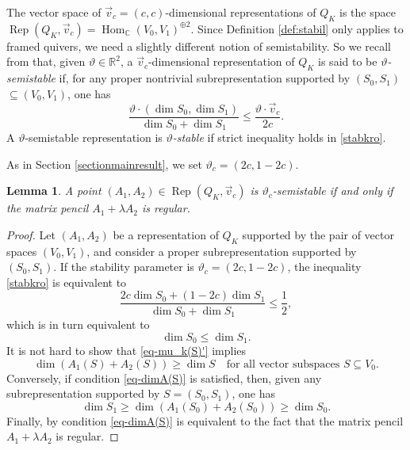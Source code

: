 \documentclass[pdftex]{sigma}
\numberwithin{equation}{section}
\newtheorem{Lemma}[Theorem]{Lemma}
\begin{document}
The vector space of $\vec{v}_c=(c,c)$-dimensional representations of $Q_{K}$ is the space
$\operatorname{Rep}(Q_K, \vec{v}_c) = \operatorname{Hom}_{\mathbb{C}}( V_0, V_1)^{\oplus 2}$.
Since Definition \ref{def:stabil} only applies to framed quivers, we need a slightly different notion of semistability.
So we recall from \cite{KiQ, Rud97} that, given $\vartheta\in\mathbb R^2$, a $\vec{v}_c$-dimensional representation of $Q_K$ is said to be \emph{$\vartheta$-semistable} if, for any proper nontrivial subrepresentation supported by $(S_0,S_1)$ {$\subseteq (V_0,V_1)$}, one has
\begin{equation}\label{stabkro}
\frac{\vartheta\cdot(\dim S_0,\dim S_1)}{\dim S_0 +\dim S_1} \leq
\frac{\vartheta\cdot \vec{v}_c}{2 c } .
\end{equation}
A $\vartheta$-semistable representation is \emph{$\vartheta$-stable} if strict inequality holds in \eqref{stabkro}.

As in Section \ref{sectionmainresult}, we set $\vartheta_c = (2c, 1-2c)$.
\begin{Lemma}
\label{lm-Q_K-ss}
A point $(A_{1},A_{2})\in \operatorname{Rep}(Q_K, \vec{v}_c)$ is $\vartheta_{c}$-semistable if and only if
the matrix pencil $A_1+ \lambda A_2$ is regular.
\end{Lemma}
\begin{proof}
Let $(A_1, A_2)$ be a representation of $Q_K$ supported by the pair of vector spaces $(V_0,V_1)$, and consider a proper subrepresentation supported by $(S_0,S_1)$.
If the stability parameter is $\vartheta_c = (2c, 1-2c)$, the inequality \eqref{stabkro} is equivalent to
\begin{equation*}
\frac{2c \dim S_0 + (1-2c)\dim S_1}{\dim S_0 +\dim S_1} \leq \frac{1}{2} ,
\end{equation*}
which is in turn equivalent to
\begin{equation}
\dim S_{0}\leq \dim S_{1} .
\label{eq-mu_k(S)'}
\end{equation}
It is not hard to show that \eqref{eq-mu_k(S)'} implies
\begin{equation}\label{eq-dimA(S)}
\dim(A_{1}(S)+A_{2}(S))\geq\dim S \quad\text{for all vector subspaces $S\subseteq V_{0}$.}
\end{equation}
 Conversely, if condition \eqref{eq-dimA(S)} is satisfied, then, given any subrepresentation supported by $S=(S_0, S_1)$,
 one has
 \begin{equation*}
\dim S_{1}\geq \dim(A_{1}(S_{0})+A_{2}(S_{0})) \geq \dim S_{0} .
\end{equation*}
Finally, by \cite[Lemma 4.10]{bblr} condition \eqref{eq-dimA(S)} is equivalent to the fact that
the matrix pencil $A_1+ \lambda A_2$ is regular.
\end{proof}
\end{document}
